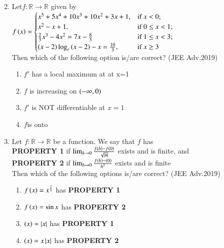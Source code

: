 \documentclass[journal,12pt,twocolumn]{IEEEtran}
\theoremstyle{remark}
\begin{document}
\begin{enumerate}[start=26]
\begin{enumerate}
\begin{multicols}{2}
\end{multicols}
\end{enumerate}
\item %
Let$f:\mathbb{R} \to \mathbb{R}$ given by \\
$f\left(x\right) = 
\begin{cases} 
x^5+5x^4+10x^3+10x^2+3x+1, & \text{if } x < 0; \\
x^2-x+1, & \text{if } 0 \leq x <1; \\
\frac{2}{3}x^3-4x^2=7x-\frac{8}{3} & \text{if } 1 \leq x <3; \\
\left(x-2\right)\log_e\left(x-2\right)-x=\frac{10}{3},& \text{if } x \geq 3
\end{cases}$ \\
Then which of the following option is/are correct?
\hfill  (JEE Adv.2019) \\
\begin{enumerate}
\item $f'$ has a local maximum at at x=1 
\item $f$ is increasing on $\left(-\infty , 0\right)$
\item $f'$ is NOT differentiable at $x=1$
\item $f$is onto 
\end{enumerate} 
 \item %
 Let $f:\mathbb{R} \to \mathbb{R}$ be a function. We say that $f$ has \\
\textbf{PROPERTY 1} if $\lim_{h\to0}\frac{f\left(h\right)-f\left(0\right)}{\sqrt{\left\vert h\right\vert}}$ exists and is finite, and \\
\textbf{PROPERTY 2} if $\lim_{h\to0}\frac{f\left(h\right)-\left(0\right)}{h^2}$ exists and is finite \\
Then which of the following options is/are correct? 
\hfill (JEE Adv.2019) \\
\begin{enumerate}
\item $f\left(x\right)=x^{\frac{2}{3}}$ has \textbf{PROPERTY 1} 
\item $f\left(x\right)=\sin{x}$ has \textbf{PROPERTY 2} 
\item $\left(x\right)=\left\vert x\right\vert$ has \textbf{PROPERTY 1} 
\item $\left(x\right)=x\left\vert x\right\vert$ has \textbf{PROPERTY 2} 
\end{enumerate}
\end{enumerate}
\end{document}
